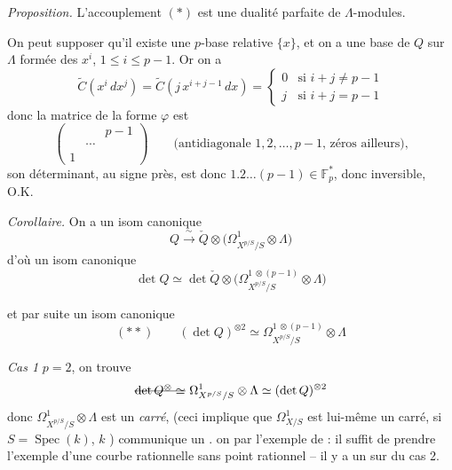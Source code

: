 \documentclass[11pt,a4paper]{article}
\begin{document}
\emph{Proposition.} L'accouplement $(*)$ est une dualité parfaite de
$\Lambda$-modules.

On peut supposer qu'il existe une $p$-base relative $\{x\}$, et on a une base
de $Q$ sur $\Lambda$ formée des  $x^i$,
$1\leq i\leq p-1$. Or on a
\[
  \widetilde{C}(x^i\,dx^j) = \widetilde{C}(j\,x^{i+j-1}\,dx) =
  \begin{cases} 0 & \text{si } i+j\neq p-1\\ j & \text{si } i+j = p-1\end{cases}
\]
donc la matrice de la forme $\varphi$ est
\[
  \begin{pmatrix} & & p-1\\ & \cdots & \\ 1 & & \end{pmatrix}
  \qquad\text{(antidiagonale $1, 2, \dots, p-1$, zéros ailleurs),}
\]
son déterminant, au signe près, est donc $1.2\dots(p-1)\in\mathbb{F}_p^*$, donc
inversible, O.K.

\emph{Corollaire.}  On a un isom canonique
\[
  Q \xrightarrow{\ \sim\ } \check{Q}\otimes\bigl(\Omega^1_{X^{p/S}/S}\otimes\Lambda\bigr)
\]
d'où un isom canonique
\[
  \det Q \simeq \det\check{Q}\otimes
  \bigl(\Omega^{1\ \otimes(p-1)}_{X^{p/S}/S}\otimes\Lambda\bigr)
\]

et par suite un isom canonique
\[
  (**)\qquad (\det Q)^{\otimes 2} \simeq
  \Omega^{1\ \otimes(p-1)}_{X^{p/S}/S}\otimes\Lambda
\]

\emph{Cas 1} $p=2$, on trouve
\[
  \text{\struck{$\det Q^{\otimes}\simeq$}}\ \Omega^1_{X^{p/S}/S}\otimes\Lambda
  \simeq (\det Q)^{\otimes 2}
\]
donc $\Omega^1_{X^{p/S}/S}\otimes\Lambda$  est un \emph{carré}, (ceci implique que
$\Omega^1_{X/S}$ est lui-même un carré, \ill{} si $S=\operatorname{Spec}(k)$,
$k$ \ill{}) \struck{\ill{}}  communique un
. \struck{\ill{}} \ill{}  on 
\struck{\ill{}} par l'exemple de  : il suffit de
prendre l'exemple d'une courbe  rationnelle sans point
rationnel \ill{} --
\struck{\ill{}} il y a un \ill{} sur  du cas 2.
\end{document}
